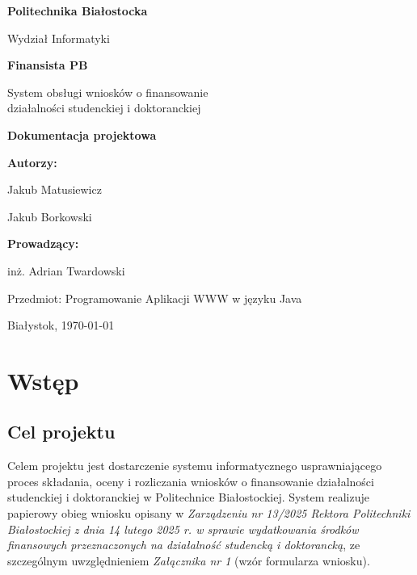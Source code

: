 \documentclass[12pt,a4paper]{article}
\begin{document}
	
	\begin{titlepage}
		\centering
		\vspace*{2cm}
		
		{\Large \textbf{Politechnika Białostocka} \par}
		{\large Wydział Informatyki \par}
		
		\vspace{3.5cm}
		
		{\Huge \textbf{Finansista PB} \par}
		\vspace{0.8cm}
		{\Large System obsługi wniosków o finansowanie \\ działalności studenckiej i doktoranckiej \par}
		
		\vspace{2.5cm}
		
		{\Large \textbf{Dokumentacja projektowa} \par}
		
		\vspace{2.5cm}
		
		{\large \textbf{Autorzy:} \par}
		\vspace{0.2cm}
		{\large Jakub Matusiewicz \par}
		{\large Jakub Borkowski \par}
		{\large \textbf{Prowadzący:} \par}
		\vspace{0.2cm}
		{\large inż. Adrian Twardowski \par}
		\vspace{0.8cm}
		{\small Przedmiot: Programowanie Aplikacji WWW w języku Java \par}
		
		\vfill
		
		{\large Białystok, \today \par}
	\end{titlepage}
	
	\thispagestyle{empty}
	\newpage
	
	\tableofcontents
	\newpage
\section{Wstęp}
\label{sec:wstep}

\subsection{Cel projektu}
Celem projektu jest dostarczenie systemu informatycznego usprawniającego proces
składania, oceny i rozliczania wniosków o finansowanie działalności studenckiej
i doktoranckiej w Politechnice Białostockiej. System realizuje papierowy obieg
wniosku opisany w \emph{Zarządzeniu nr 13/2025 Rektora Politechniki Białostockiej
z dnia 14 lutego 2025 r. w sprawie wydatkowania środków finansowych przeznaczonych
na działalność studencką i doktorancką}, ze szczególnym uwzględnieniem
\emph{Załącznika nr 1} (wzór formularza wniosku).
\end{document}
